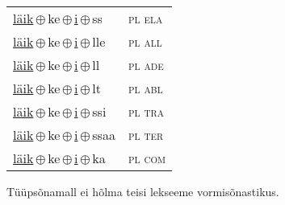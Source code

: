 \begin{minipage}{\textwidth}
\begin{sideways}
\begin{tabular}{l l}
\underline{läik}\,$\oplus$\,ke\,$\oplus$\,\underline{i}\,$\oplus$\,ss & \textsc{ pl ela } \\
\underline{läik}\,$\oplus$\,ke\,$\oplus$\,\underline{i}\,$\oplus$\,lle & \textsc{ pl all } \\
\underline{läik}\,$\oplus$\,ke\,$\oplus$\,\underline{i}\,$\oplus$\,ll & \textsc{ pl ade } \\
\underline{läik}\,$\oplus$\,ke\,$\oplus$\,\underline{i}\,$\oplus$\,lt & \textsc{ pl abl } \\
\underline{läik}\,$\oplus$\,ke\,$\oplus$\,\underline{i}\,$\oplus$\,ssi & \textsc{ pl tra } \\
\underline{läik}\,$\oplus$\,ke\,$\oplus$\,\underline{i}\,$\oplus$\,ssaa & \textsc{ pl ter } \\
\underline{läik}\,$\oplus$\,ke\,$\oplus$\,\underline{i}\,$\oplus$\,ka & \textsc{ pl com } \\
\end{tabular}
\end{sideways}
\label{tab:tüüpsõnamall-läikki}

\end{minipage}

 
\vspace{1em}
\noindent Tüüpsõnamall  ei hõlma teisi lekseeme vormi\-sõnastikus.
